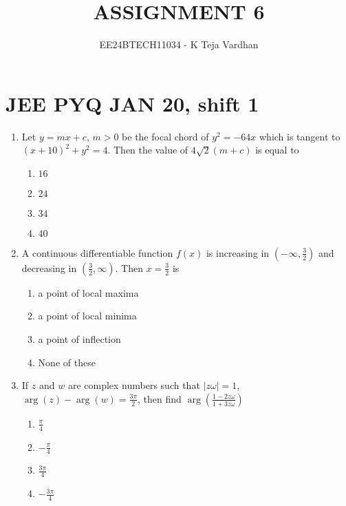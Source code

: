 \documentclass[journal]{IEEEtran}
\newcommand{\brak}[1]{\left( #1 \right)}
\newcommand{\abs}[1]{\left| #1 \right|}
\newcommand{\gt}{>}
\begin{document}

\title{ASSIGNMENT 6}
\author{EE24BTECH11034 - K Teja Vardhan}
{\let\newpage\relax\maketitle}

\section{JEE PYQ JAN 20, shift 1}
\begin{enumerate}
        
    \item Let $y = mx + c$, $m \gt 0$ be the focal chord of $y^2 = -64x$ which is tangent to $\brak{x + 10}^2 + y^2 = 4$. Then the value of $4\sqrt{2} \brak{m + c}$ is equal to
    
        \begin{multicols}{4}
        \begin{enumerate}
        \item $16$
        \item $24$
        \item $34$
        \item $40$
        \end{enumerate}    
        \end{multicols}
        
    \item A continuous differentiable function $f\brak{x}$ is increasing in $\brak{-\infty, \frac{3}{2}}$ and decreasing in $\brak{\frac{3}{2}, \infty}$. Then $x = \frac{3}{2}$ is
        
        \begin{enumerate}
        \item a point of local maxima
        \item a point of local minima
        \item a point of inflection
        \item None of these
        \end{enumerate}

    \item If $z$ and $w$ are complex numbers such that $\abs{z \omega} = 1$, $\arg\brak{z} - \arg\brak{w} = \frac{3\pi}{2}$, then find $\arg\brak{\frac{1 - 2z\omega}{1 + 3z\omega}}$
    
        \begin{multicols}{4}
        \begin{enumerate}
        \item $\frac{\pi}{4}$
        \item $-\frac{\pi}{4}$
        \item $\frac{3\pi}{4}$
        \item $-\frac{3\pi}{4}$
        \end{enumerate}
        \end{multicols}
        

\end{enumerate}
\end{document}
